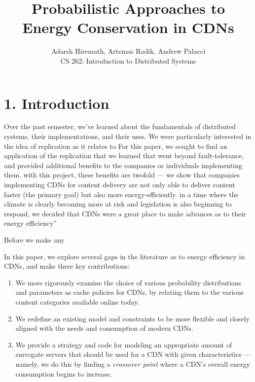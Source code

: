 \documentclass[
	a4paper, %
	10pt, %
	unnumberedsections, %
	twoside, %
]{LTJournalArticle}
\title{Probabilistic Approaches to 
\\ Energy Conservation in CDNs} %
\author{%
	Adarsh Hiremath, Artemas Radik, Andrew Palacci \\
	CS 262: Introduction to Distributed Systems \\
}
\begin{document}
\maketitle %


\section{1. Introduction}
Over the past semester, we've learned about the fundamentals of distributed systems, their implementations, and their uses. We were particularly interested in the idea of replication as it relates to  For this paper, we sought to find an application of the replication that we learned that went beyond fault-tolerance, and provided additional benefits to the companies or individuals implementing them. with this project, these benefits are twofold — we show that companies implementing CDNs for content delivery are not only able to deliver content faster (the primary goal) but also more energy-efficiently. in a time where the climate is clearly becoming more at risk and legislation is also beginning to respond, we decided that CDNs were a great place to make advances as to their energy efficiency”

Before we make any 

In this paper, we explore several gaps in the literature as to energy efficiency in CDNs, and make three key contributions:
\begin{enumerate}
    \item We more rigorously examine the choice of various probability distributions and parameters as cache policies for CDNs, by relating them to the various content categories available online today.
    \item We redefine an existing model and constraints to be more flexible and closely aligned with the needs and consumption of modern CDNs.
    \item We provide a strategy and code for modeling an appropriate amount of surrogate servers that should be used for a CDN with given characteristics --- namely, we do this by finding a \textit{crossover point} where a CDN's overall energy consumption begins to increase.
\end{enumerate}
\end{document}
